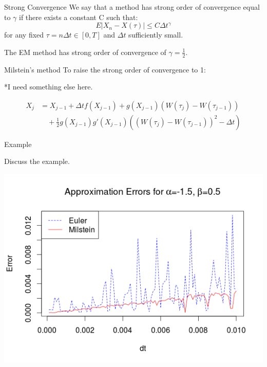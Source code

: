 \begin{frame}
\begin{block}{Strong Convergence}
We say that a method has strong order of convergence equal to $\gamma$ if there exists a constant C such that:
$$E|X_n-X(\tau)|\leq C \Delta t^\gamma$$
for any fixed $\tau=n \Delta t \in [0,T]$ and $\Delta t$ sufficiently small.
\end{block}
\bigskip
The EM method has strong order of convergence of $\gamma=\frac{1}{2}$.
\end{frame}

\begin{frame}{Milstein's method}
To raise the strong order of convergence to 1:	

*I need something else here.

	\begin{equation*}
	\begin{split}
	X_{j} & =X_{j-1}+\Delta t f(X_{j-1})+g(X_{j-1})(W(\tau_j)-W(\tau_{j-1}))\\
	  &\quad +\frac{1}{2}g(X_{j-1})g'(X_{j-1})((W(\tau_j)-W(\tau_{j-1}))^2-\Delta t)
	\end{split}
	\end{equation*}
\end{frame}

\begin{frame}{Example}

  Discuss the example.
  
\end{frame}

\begin{frame}
	\begin{center}
	\includegraphics[scale=0.55]{alpham15_beta05.png} 
	\end{center}
\end{frame}

